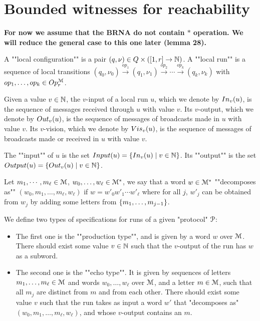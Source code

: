 \section{Bounded witnesses for reachability}

\textbf{For now we assume that the BRNA do not contain $*$ operation. We will reduce the general case to this one later (lemma 28).}

\begin{definition}
	A ""local configuration"" is a pair $(q, \nu) \in Q \times ([1,r] \to \mathbb{N})$.
	A ""local run"" is a sequence of local transitions $(q_0, \nu_0) \xrightarrow{op_1} (q_1, \nu_1) \xrightarrow{op_2} \cdots \xrightarrow{op_k} (q_k, \nu_k)$ with $op_1, \ldots, op_k \in Op_r^{\mathcal{M}}$.
	
	Given a value $v \in \mathbb{N}$, the $v$-input of a local run $u$, which we denote by $In_{v}(u)$, is the sequence of messages received through $u$ with value $v$.
	Its $v$-output, which we denote by $Out_{v}(u)$, is the sequence of messages of broadcasts made in $u$ with value $v$. 
	Its $v$-vision, which we denote by $Vis_{v}(u)$, is the sequence of messages of broadcasts made or received in $u$ with value $v$. 
	
	The ""input"" of $u$ is the set $Input(u) = \{In_{v}(u) \mid v \in \mathbb{N}\}$.
	Its ""output"" is the set $Output(u)=\{Out_{v}(u) \mid v \in \mathbb{N}\}$.
\end{definition}

\begin{definition}
	Let $m_1, \cdots, m_\ell \in \mathcal{M}$, $w_0, \ldots, w_\ell \in \mathcal{M}^*$, we say that a word $w \in \mathcal{M}^*$ ""decomposes as"" $(w_0, m_1, \ldots, m_\ell, w_\ell)$ if $w = w'_0 w'_1 \cdots w'_\ell$ where for all $j$, $w'_j$ can be obtained from $w_j$ by adding some letters from $\{m_1, \ldots, m_{j-1}\}$.
\end{definition}

\begin{definition}
	We define two types of specifications for runs of a given "protocol" $\mathcal{P}$:
	
	\begin{itemize}
		\item The first one is the ""production type"", and is given by a word $w$ over $\mathcal{M}$. There should exist some value $v \in \mathbb{N}$ such that the $v$-output of the run has $w$ as a subword.
		
		\item The second one is the ""echo type"". It is given by sequences of letters $m_1, \ldots, m_\ell \in \mathcal{M}$ and words $w_0, \ldots, w_\ell$ over $\mathcal{M}$, and a letter $m \in \mathcal{M}$, such that all $m_j$ are distinct from $m$ and from each other.
		There should exist some value $v$ such that the run takes as input a word $w'$ that "decomposes as" $(w_0, m_1, \ldots, m_\ell, w_\ell)$, and whose $v$-output contains an $m$.
	\end{itemize}
\end{definition}


